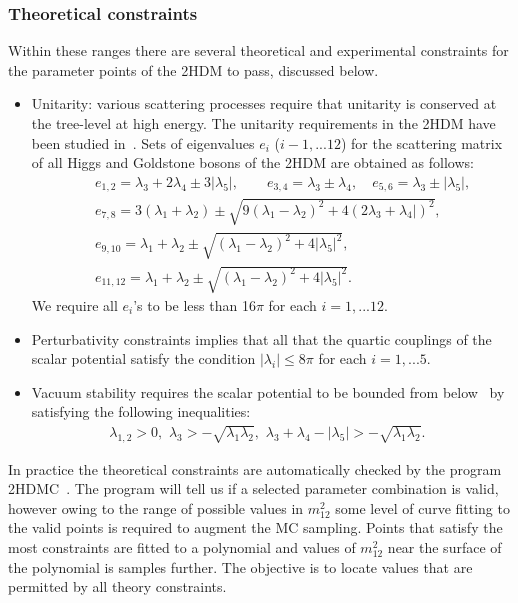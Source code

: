 \subsubsection{Theoretical constraints}
Within these ranges there are several theoretical and experimental constraints for the parameter points of the 2HDM to pass, discussed below.	
\begin{itemize}
	\item Unitarity: various scattering processes  require that unitarity is conserved at the tree-level at high energy.
    The unitarity requirements in the 2HDM have been studied in~\cite{Kanemura1993LeeQuiggThacker, Akeroyd2000TreeLevel, arhrib2000unitarity}.
	Sets of eigenvalues $e_i$ ($i-1, ... 12$) for the scattering  matrix of all Higgs and Goldstone bosons of the 2HDM are obtained as follows:
	\begin{eqnarray}
	&& e_{1,2} =  \lambda_3+2\lambda_4\pm 3 | \lambda_5| , \quad  \quad  e_{3,4} = \lambda_3\pm\lambda_4 , \quad e_{5,6} =  \lambda_3\pm|\lambda_5|,  \nonumber \\
	&&
	e_{7,8} = 3(\lambda_1+\lambda_2)\pm\sqrt{9(\lambda_1-\lambda_2)^2+4(2\lambda_3+\lambda_4|)^2},  \nonumber \\
	&&
	e_{9,10} = \lambda_1+\lambda_2\pm\sqrt{(\lambda_1-\lambda_2)^2+4|\lambda_5|^2},  \nonumber \\
	&&
	e_{11,12}  = \lambda_1+\lambda_2\pm\sqrt{(\lambda_1-\lambda_2)^2+4|\lambda_5|^2}.
	\end{eqnarray}
    We require all \(e_i\)'s to be less than 16\(\pi\) for each \(i=1,...12\).
\item Perturbativity constraints \cite{Kanemura1993LeeQuiggThacker,Branco_2HDMreview2011} implies that all that the quartic couplings of the scalar potential satisfy the condition \(|\lambda_i| \leqslant 8 \pi\) for each \(i=1,...5\).
	
	\item Vacuum stability requires the scalar potential to be bounded from below~\cite{Gunion2003decouple} by satisfying the following inequalities:
	\begin{eqnarray}
	\lambda_{1,2}>0,  \,\,
	\lambda_3>- \sqrt{\lambda_1\lambda_2}, \,\,
	\lambda_3+\lambda_4-|\lambda_5|> - \sqrt{\lambda_1\lambda_2}.~~~
	\end{eqnarray}
	
\end{itemize}
In practice the theoretical constraints are automatically checked by the program 2HDMC~\cite{Eriksson20102HDMC}.
The program will tell us if a selected parameter combination is valid,
however owing to the range of possible values in \(m_{12}^2\) some level of curve fitting to the valid points
is required to augment the MC sampling.
Points that satisfy the most constraints are fitted to a polynomial and
values of \(m_{12}^2\) near the surface of the polynomial is samples further.
The objective is to locate values that are permitted by all theory constraints.

